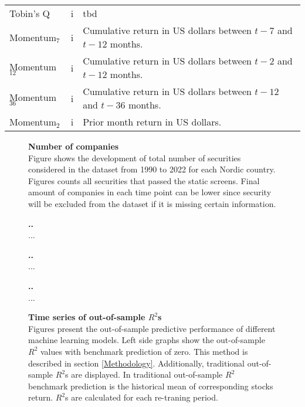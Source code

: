 \documentclass{article}
\begin{document}
\begin{table}[h]
\begin{tabularx}{\textwidth}{l X X}
Tobin's Q 				& i						& tbd\\
Momentum$_{7}$ 		& i						& Cumulative return in US dollars between $t-7$ and $t-12$ months.\\
Momentum$_{12}$ 		& i						& Cumulative return in US dollars between $t-2$ and $t-12$ months.\\
Momentum$_{36}$ 		& i						& Cumulative return in US dollars between $t-12$ and $t-36$ months.\\
Momentum$_{2}$ 		& i						& Prior month return in US dollars.\\ 
\bottomrule
\end{tabularx}
\end{table} 

\begin{figure}[h]
\centering
\caption[Number of companies]{\textbf{Number of companies}\\ Figure shows the development of total number of securities considered in the dataset from 1990 to 2022 for each Nordic country. Figures counts all securities that passed the static screens. Final amount of companies in each time point can be lower since security will be excluded from the dataset if it is missing certain information.}

\label{plot:number_of_companies}
\end{figure}

\begin{figure}[H]
\centering
\caption[Cumulative return of value weighted machine learning portfolios]{\textbf{..}\\ ...}

\label{plot:cumul_vw_portf_return}
\end{figure}

\begin{figure}[H]
\centering
\caption[Cumulative return of value weighted zero investment portfolios]{\textbf{..}\\ ...}

\label{plot:cumul_vw_LS_portf_return}
\end{figure}

\begin{figure}[h]
\centering
\caption[Relative variable importance]{\textbf{..}\\ ...}

\label{plot:relative_VI}
\end{figure}

\begin{figure}[h]
\centering
\caption[Time series of out-of-sample $R^2$]{\textbf{Time series of out-of-sample \boldmath$R^2$s}\\ Figures present the out-of-sample predictive performance of different machine learning models. Left side graphs show the out-of-sample $R^2$ values with benchmark prediction of zero. This method is described in section \ref{Methodology}. Additionally, traditional out-of-sample $R^2$s are displayed. In traditional out-of-sample $R^2$ benchmark prediction is the historical mean of corresponding stocks return. $R^2$s are calculated for each re-traning period.}

\label{plot:OOSR2_ts}
\end{figure}
\end{document}
